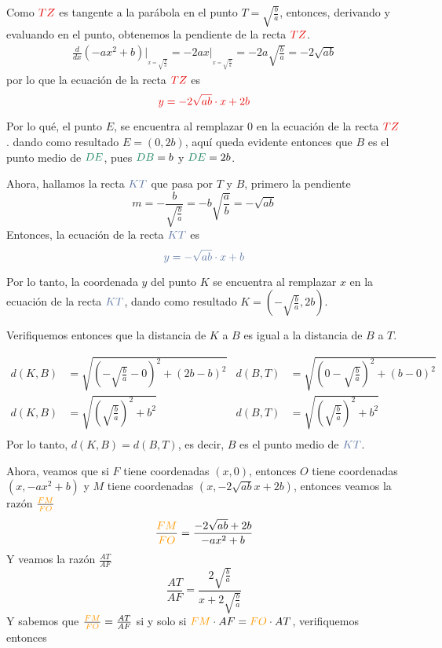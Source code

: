 \documentclass{amsart}
\begin{document}
{    Como $\tz$ es tangente a la parábola en el punto $T = \sqrt{\frac{b}{a}}$, entonces, derivando y evaluando en el punto, obtenemos la pendiente de la recta $\tz$.
    \begin{align*}
        \frac{d}{dx}(-ax^2 + b)\Big|_{_{x=\sqrt{\frac{b}{a}}}} = -2 a x \Big|_{_{x=\sqrt{\frac{b}{a}}}} = -2 a \sqrt{\frac{b}{a}} = -2 \sqrt{ab}
    \end{align*}
    por lo que la ecuación de la recta $\tz$ es
    $$ \textcolor{az1}{y = -2\sqrt{ab} \cdot x + 2b} $$

    Por lo qué, el punto $E$, se encuentra al remplazar $0$ en la ecuación de la recta $\tz$. dando como resultado $ E = (0, 2b) $, aquí queda evidente entonces que $B$ es el punto medio de $\de$, pues $\db=b$ y $\de=2b$.

    Ahora, hallamos la recta $\kt$ que pasa por $T$ y $B$, primero la pendiente
    $$ m = -\frac{b}{\sqrt{\frac{b}{a}}} = -b\sqrt{\frac{a}{b}} = -\sqrt{ab} $$
    Entonces, la ecuación de la recta $\kt$ es
    $$ \textcolor{az2}{y = -\sqrt{ab}\cdot x + b } $$

    Por lo tanto, la coordenada $y$ del punto $K$ se encuentra al remplazar $x$ en la ecuación de la recta $\kt$, dando como resultado $ K = (-\sqrt{\frac{b}{a}}, 2b) $.

    Verifiquemos entonces que la distancia de $K$ a $B$ es igual a la distancia de $B$ a $T$.

    \begin{align*}
        d(K,B) &= \sqrt{ \left(-\sqrt{\frac{b}{a}} - 0\right)^2 + \left( 2b - b \right)^2 } & 
        d(B,T) &= \sqrt{ \left(0 - \sqrt{\frac{b}{a}}\right)^2 + \left( b - 0 \right)^2 }  \\
        d(K,B) &= \sqrt{ \left(\sqrt{\frac{b}{a}} \right)^2 +  b^2 } &
        d(B,T) &= \sqrt{ \left(\sqrt{\frac{b}{a}} \right)^2 + b^2 } \\ 
    \end{align*}
    Por lo tanto, $d(K,B) = d(B,T)$, es decir, $B$ es el punto medio de $\kt$.


    Ahora, veamos que si $F$ tiene coordenadas $(x,0)$, entonces $O$ tiene coordenadas $(x, -ax^2+b)$ y $M$ tiene coordenadas $(x, -2\sqrt{ab}x + 2b)$, entonces veamos la razón $\frac{\fm}{\fo}$
    $$ \frac{\fm}{\fo} = \frac{-2\sqrt{ab}+2b}{-ax^2 + b } $$
    Y veamos la razón $\frac{AT}{AF}$
    $$ \frac{AT}{AF} = \frac{ 2 \sqrt{\frac{b}{a}} }{x + 2 \sqrt{\frac{b}{a}}} $$
    Y sabemos que $\frac{\fm}{\fo} = \frac{AT}{AF}$ si y solo si $\fm \cdot AF = \fo \cdot AT$, verifiquemos entonces

}
\end{document}

